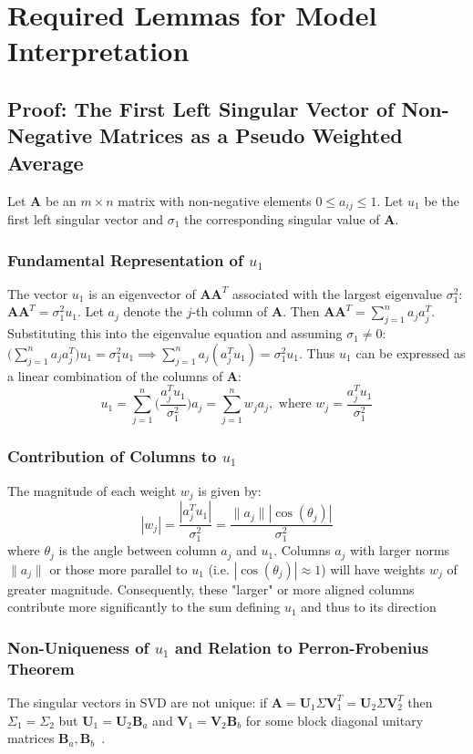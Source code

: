 \chapter{Required Lemmas for Model Interpretation}

\section{Proof: The First Left Singular Vector of Non-Negative Matrices as a
Pseudo Weighted Average}
\label{app:vector-to-avg}
Let $\mathbf{A}$ be an $m \times n$ matrix with non-negative elements $0 \leq
a_{ij} \leq 1$. Let $u_1$ be the first left singular vector and $\sigma_1$ the
corresponding singular value of $\mathbf{A}$.

\subsection{Fundamental Representation of $u_1$}
The vector $u_1$ is an eigenvector of $\mathbf{AA}^T$ associated with the
largest eigenvalue $\sigma_1^2$: $\mathbf{AA}^T = \sigma_1^2 u_1$. Let $a_j$
denote the $j$-th column of $\mathbf{A}$. Then $\mathbf{AA}^T = \sum_{j=1}^n a_j
a_j^T$. Substituting this into the eigenvalue equation and assuming $\sigma_1
\neq 0$: $\big( \sum_{j = 1}^n a_j a_j^T\big) u_1 = \sigma_1^2 u_1 \implies
\sum_{j=1}^n a_j (a_j^T u_1) = \sigma_1^2 u_1$. Thus $u_1$ can be expressed as a
linear combination of the columns of $\mathbf{A}$:
\[ u_1 = \sum_{j=1}^n \bigg(\frac{a_j^T u_1}{\sigma_1^2}\bigg) a_j =
\sum_{j=1}^n w_j a_j, \text{  where } w_j = \frac{a_j^T u_1}{\sigma_1^2} \]

\subsection{Contribution of Columns to $u_1$}
The magnitude of each weight $w_j$ is given by:
\[ |w_j| = \frac{|a_j^T u_1|}{\sigma_1^2} = \frac{\parallel a_j\parallel
|\cos(\theta_j)|}{\sigma_1^2}\]
where $\theta_j$ is the angle between column $a_j$ and $u_1$. Columns $a_j$ with
larger norms $\parallel a_j \parallel$ or those more parallel to $u_1$ (i.e.
$|\cos(\theta_j)| \approx 1$) will have weights $w_j$ of greater magnitude.
Consequently, these "larger" or more aligned columns contribute more
significantly to the sum defining $u_1$ and thus to its direction

\subsection{Non-Uniqueness of $u_1$ and Relation to Perron-Frobenius Theorem}
The singular vectors in SVD are not unique: if $\mathbf{A} =
\mathbf{U}_1\Sigma\mathbf{V}_1^T = \mathbf{U}_2\Sigma\mathbf{V}_2^T$ then
$\Sigma_1 = \Sigma_2$ but $\mathbf{U}_1 = \mathbf{U}_2\mathbf{B}_a$ and
$\mathbf{V}_1 = \mathbf{V}_2\mathbf{B}_b$ for some block diagonal unitary
matrices $\mathbf{B}_a, \mathbf{B}_b$~\cite{eftekhari2019moses}.

